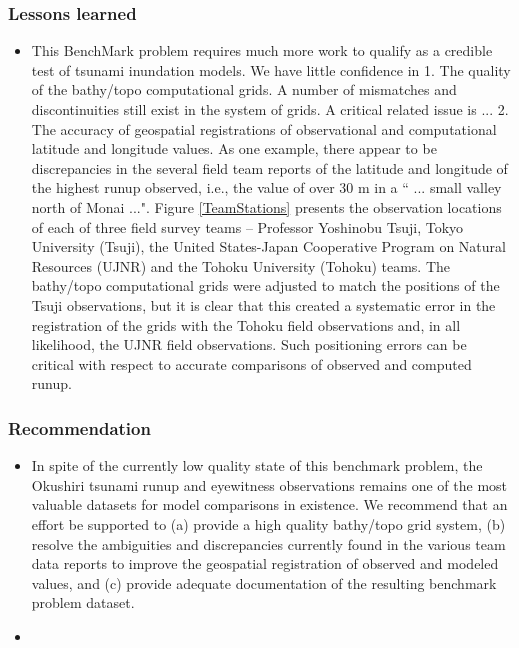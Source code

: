 \subsubsection{Lessons learned}
\begin{itemize}
\item This BenchMark problem requires much more work to qualify as a credible test of tsunami inundation models.  We have little confidence in 
   1. The quality of the bathy/topo computational grids.  A number of mismatches and discontinuities still exist in the system of grids.  A critical related issue is ... 
   2. The accuracy of geospatial registrations of observational and computational latitude and longitude values.  As one example, there appear to be discrepancies in the several field team reports of the latitude and longitude of the highest runup observed, i.e., the value of over 30 m in a `` ... small valley north of Monai ...".  Figure \ref{TeamStations} presents the observation locations of each of three field survey teams -- Professor Yoshinobu Tsuji, Tokyo University (Tsuji), the United States-Japan Cooperative Program on Natural Resources (UJNR) and the Tohoku University (Tohoku) teams.  The bathy/topo computational grids were adjusted to match the positions of the Tsuji observations, but it is clear that this created a systematic error in the registration of the grids with the Tohoku field observations and, in all likelihood, the UJNR field observations.  Such positioning errors can be critical with respect to accurate comparisons of observed and computed runup.
\end{itemize}


\subsubsection{Recommendation}
\begin{itemize}
\item In spite of the currently low quality state of this benchmark problem, the Okushiri tsunami runup and eyewitness observations remains one of the most valuable datasets for model comparisons in existence.  We recommend that an effort be supported to (a) provide a high quality bathy/topo grid system, (b) resolve the ambiguities and discrepancies currently found in the various team data reports to improve the geospatial registration of observed and modeled values, and (c) provide adequate documentation of the resulting benchmark problem dataset.
\end{itemize}



\begin{itemize}
\item 
\end{itemize}

